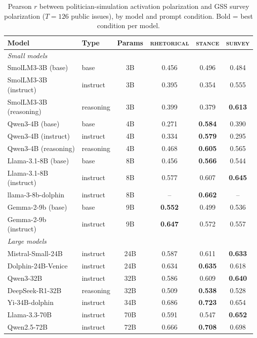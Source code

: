 \begin{table}[ht]
\centering
\small
\caption{Pearson $r$ between politician-simulation activation polarization and GSS survey polarization ($T = 126$ public issues), by model and prompt condition. Bold = best condition per model.}
\label{tab:politician_results}
\begin{tabular}{llcccc}
\toprule
Model & Type & Params & \textsc{rhetorical} & \textsc{stance} & \textsc{survey} \\
\midrule
\multicolumn{6}{l}{\textit{Small models}} \\
SmolLM3-3B (base)      & base      & 3B  & 0.456 & 0.496 & 0.484 \\
SmolLM3-3B (instruct)  & instruct  & 3B  & 0.395 & 0.354 & 0.555 \\
SmolLM3-3B (reasoning) & reasoning & 3B  & 0.399 & 0.379 & \textbf{0.613} \\
Qwen3-4B (base)        & base      & 4B  & 0.271 & \textbf{0.584} & 0.390 \\
Qwen3-4B (instruct)    & instruct  & 4B  & 0.334 & \textbf{0.579} & 0.295 \\
Qwen3-4B (reasoning)   & reasoning & 4B  & 0.468 & \textbf{0.605} & 0.565 \\
Llama-3.1-8B (base)    & base      & 8B  & 0.456 & \textbf{0.566} & 0.544 \\
Llama-3.1-8B (instruct)& instruct  & 8B  & 0.577 & 0.607 & \textbf{0.645} \\
llama-3-8b-dolphin     & instruct  & 8B  & -- & \textbf{0.662} & -- \\
Gemma-2-9b (base)      & base      & 9B  & \textbf{0.552} & 0.499 & 0.536 \\
Gemma-2-9b (instruct)  & instruct  & 9B  & \textbf{0.647} & 0.572 & 0.557 \\
\midrule
\multicolumn{6}{l}{\textit{Large models}} \\
Mistral-Small-24B      & instruct  & 24B & 0.587 & 0.611 & \textbf{0.633} \\
Dolphin-24B-Venice     & instruct  & 24B & 0.634 & \textbf{0.635} & 0.618 \\
Qwen3-32B              & instruct  & 32B & 0.586 & 0.609 & \textbf{0.640} \\
DeepSeek-R1-32B        & reasoning & 32B & 0.509 & \textbf{0.538} & 0.528 \\
Yi-34B-dolphin          & instruct  & 34B & 0.686 & \textbf{0.723} & 0.654 \\
Llama-3.3-70B          & instruct  & 70B & 0.591 & 0.547 & \textbf{0.652} \\
Qwen2.5-72B            & instruct  & 72B & 0.666 & \textbf{0.708} & 0.698 \\
\bottomrule
\end{tabular}
\end{table}

